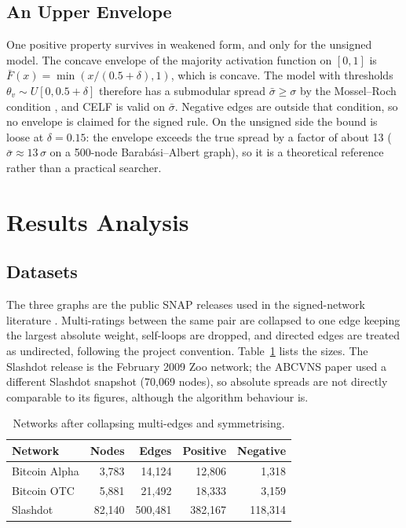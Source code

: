 \documentclass[journal,letterpaper,10pt]{IEEEtran}
\begin{document}
\subsection{An Upper Envelope}

One positive property survives in weakened form, and only for the unsigned model. The concave envelope of the majority activation function on $[0,1]$ is $\bar F(x)=\min(x/(0.5+\delta),1)$, which is concave. The model with thresholds $\theta_v\sim U[0,0.5+\delta]$ therefore has a submodular spread $\bar\sigma\ge\sigma$ by the Mossel--Roch condition \cite{mossel2007}, and CELF is valid on $\bar\sigma$. Negative edges are outside that condition, so no envelope is claimed for the signed rule. On the unsigned side the bound is loose at $\delta=0.15$: the envelope exceeds the true spread by a factor of about 13 ($\bar\sigma\approx13\,\sigma$ on a 500-node Barab\'asi--Albert graph), so it is a theoretical reference rather than a practical searcher.

\section{Results Analysis}

\subsection{Datasets}

The three graphs are the public SNAP releases used in the signed-network literature \cite{kumar2016,kunegis2009,kunegis2010,leskovec2010}. Multi-ratings between the same pair are collapsed to one edge keeping the largest absolute weight, self-loops are dropped, and directed edges are treated as undirected, following the project convention. Table~\ref{tab:data} lists the sizes. The Slashdot release is the February 2009 Zoo network; the ABCVNS paper used a different Slashdot snapshot (70{,}069 nodes), so absolute spreads are not directly comparable to its figures, although the algorithm behaviour is.

\begin{table}[!t]
\centering
\caption{Networks after collapsing multi-edges and symmetrising.}
\label{tab:data}
\footnotesize
\setlength{\tabcolsep}{3pt}
\begin{tabular}{@{}lrrrr@{}}
\toprule
Network & Nodes & Edges & Positive & Negative\\
\midrule
Bitcoin Alpha & 3{,}783 & 14{,}124 & 12{,}806 & 1{,}318\\
Bitcoin OTC   & 5{,}881 & 21{,}492 & 18{,}333 & 3{,}159\\
Slashdot      & 82{,}140 & 500{,}481 & 382{,}167 & 118{,}314\\
\bottomrule
\end{tabular}
\end{table}
\end{document}
